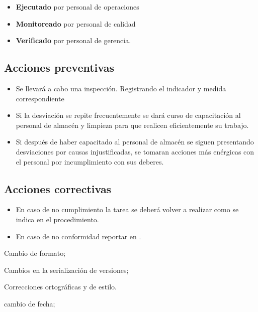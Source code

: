 \begin{itemize}
	\item \textbf{Ejecutado} por personal de operaciones
	\item \textbf{Monitoreado} por personal de calidad
	\item \textbf{Verificado} por personal de gerencia.
\end{itemize}

\subsection{Acciones preventivas}

\begin{itemize}
	\item Se llevará a cabo una inspección. Registrando el indicador y medida correspondiente
	\item Si la desviación se repite frecuentemente se dará curso de capacitación al personal de almacén y limpieza para que realicen eficientemente su trabajo.
	\item Si después de haber capacitado al personal de almacén se siguen presentando desviaciones por causas injustificadas, se tomaran acciones más enérgicas con el personal por incumplimiento con sus deberes.
\end{itemize}

\subsection{Acciones correctivas}

\begin{itemize}
	\item En caso de no cumplimiento la tarea se deberá volver a realizar como se indica en el procedimiento.
	\item En caso de no conformidad reportar en \RAC.
\end{itemize}

\begin{changelog}[title=Registro de cambios,simple, sectioncmd=\subsection*,label=changelog-\thesection-\MayorVer.\MenorVer9]
	\begin{version}[v=\MayorVer.\MenorVer, date=2023--01, author=Pablo E. Alanis]
		\item Cambio de formato;
		\item Cambios en la serialización de versiones;
		\item Correcciones ortográficas y de estilo.
	\end{version}

	\begin{version}[v=1.7, date=2022--05, author=Alonso M.]
		\item cambio de fecha;
	\end{version}	

\end{changelog}
